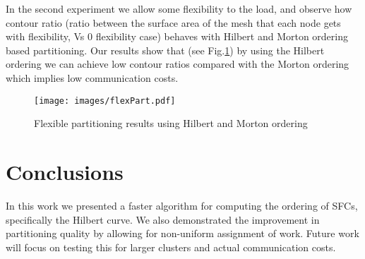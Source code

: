 \documentclass{sig-alternate}
\begin{document}
In the second experiment we allow some flexibility to the load, and observe how contour ratio (ratio between the surface area of the mesh that each node gets with flexibility, Vs 0 flexibility case)
behaves with Hilbert and Morton ordering based partitioning. Our results show that (see Fig.\ref{flexibility}) by using the Hilbert ordering we can achieve low contour ratios compared with the Morton ordering which implies low
communication costs.

\begin{figure}[tbh]
\centering
\texttt{[image: images/flexPart.pdf]}
\caption{ Flexible partitioning results using Hilbert and Morton ordering \label{flexibility}}
\end{figure}
\section*{Conclusions}
In this work we presented a faster algorithm for computing the ordering of SFCs, specifically the Hilbert curve. We also demonstrated the improvement in partitioning quality by allowing for non-uniform assignment of work. Future work will focus on testing this for larger clusters and actual communication costs. 

 
\end{document}
